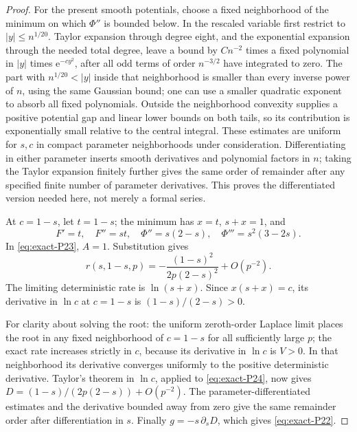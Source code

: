 \begin{proof}
For the present smooth potentials, choose a fixed neighborhood of the minimum on which \(\Phi''\) is bounded below. In the rescaled variable first restrict to \(|y|\le n^{1/20}\). Taylor expansion through degree eight, and the exponential expansion through the needed total degree, leave a bound by \(C n^{-2}\) times a fixed polynomial in \(|y|\) times \(\mathrm{e}^{-c y^2}\), after all odd terms of order \(n^{-3/2}\) have integrated to zero. The part with \(n^{1/20}<|y|\) inside that neighborhood is smaller than every inverse power of \(n\), using the same Gaussian bound; one can use a smaller quadratic exponent to absorb all fixed polynomials. Outside the neighborhood convexity supplies a positive potential gap and linear lower bounds on both tails, so its contribution is exponentially small relative to the central integral. These estimates are uniform for \(s,c\) in compact parameter neighborhoods under consideration. Differentiating in either parameter inserts smooth derivatives and polynomial factors in \(n\); taking the Taylor expansion finitely further gives the same order of remainder after any specified finite number of parameter derivatives. This proves the differentiated version needed here, not merely a formal series.

At \(c=1-s\), let \(t=1-s\); the minimum has \(x=t\), \(s+x=1\), and
\begin{equation}
 F'=t,\quad F''=st,\quad
 \Phi''=s(2-s),\quad \Phi'''=s^2(3-2s).
\end{equation}
In \eqref{eq:exact-P23}, \(A=1\). Substitution gives
\begin{equation}
 r(s,1-s,p)=-\frac{(1-s)^2}{2p(2-s)^2}+O(p^{-2}).     \label{eq:exact-P24}
\end{equation}
The limiting deterministic rate is \(\ln(s+x)\). Since
\(x(s+x)=c\), its derivative in \(\ln c\) at \(c=1-s\) is
\((1-s)/(2-s)>0\).

For clarity about solving the root: the uniform zeroth-order Laplace limit places the root in any fixed neighborhood of \(c=1-s\) for all sufficiently large \(p\); the exact rate increases strictly in \(c\), because its derivative in \(\ln c\) is \(V>0\). In that neighborhood its derivative converges uniformly to the positive deterministic derivative. Taylor's theorem in \(\ln c\), applied to \eqref{eq:exact-P24}, now gives
\(D=(1-s)/(2p(2-s))+O(p^{-2})\). The parameter-differentiated estimates and the derivative bounded away from zero give the same remainder order after differentiation in \(s\). Finally \(g=-s\,\partial_sD\), which gives \eqref{eq:exact-P22}. \end{proof}

